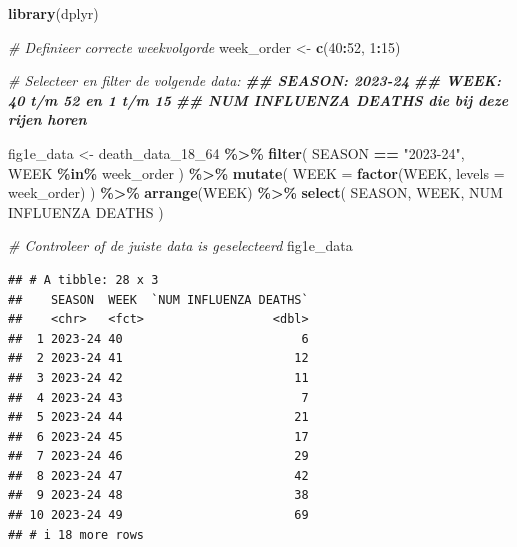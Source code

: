 \documentclass[
]{book}
\newenvironment{Shaded}{\begin{snugshade}}{\end{snugshade}}
\newcommand{\AttributeTok}[1]{\textcolor[rgb]{0.13,0.29,0.53}{#1}}
\newcommand{\CommentTok}[1]{\textcolor[rgb]{0.56,0.35,0.01}{\textit{#1}}}
\newcommand{\DecValTok}[1]{\textcolor[rgb]{0.00,0.00,0.81}{#1}}
\newcommand{\DocumentationTok}[1]{\textcolor[rgb]{0.56,0.35,0.01}{\textbf{\textit{#1}}}}
\newcommand{\FunctionTok}[1]{\textcolor[rgb]{0.13,0.29,0.53}{\textbf{#1}}}
\newcommand{\NormalTok}[1]{#1}
\newcommand{\OtherTok}[1]{\textcolor[rgb]{0.56,0.35,0.01}{#1}}
\newcommand{\SpecialCharTok}[1]{\textcolor[rgb]{0.81,0.36,0.00}{\textbf{#1}}}
\newcommand{\StringTok}[1]{\textcolor[rgb]{0.31,0.60,0.02}{#1}}
\begin{document}
\begin{Shaded}
\begin{Highlighting}[]
\FunctionTok{library}\NormalTok{(dplyr)}

\CommentTok{\# Definieer correcte weekvolgorde}
\NormalTok{week\_order }\OtherTok{\textless{}{-}} \FunctionTok{c}\NormalTok{(}\DecValTok{40}\SpecialCharTok{:}\DecValTok{52}\NormalTok{, }\DecValTok{1}\SpecialCharTok{:}\DecValTok{15}\NormalTok{)}

\CommentTok{\# Selecteer en filter de volgende data:}
\DocumentationTok{\#\# SEASON: 2023{-}24}
\DocumentationTok{\#\# WEEK: 40 t/m 52 en 1 t/m 15}
\DocumentationTok{\#\# NUM INFLUENZA DEATHS die bij deze rijen horen}

\NormalTok{fig1e\_data }\OtherTok{\textless{}{-}}\NormalTok{ death\_data\_18\_64 }\SpecialCharTok{\%\textgreater{}\%}
  \FunctionTok{filter}\NormalTok{(}
\NormalTok{    SEASON }\SpecialCharTok{==} \StringTok{"2023{-}24"}\NormalTok{,}
\NormalTok{    WEEK }\SpecialCharTok{\%in\%}\NormalTok{ week\_order}
\NormalTok{  ) }\SpecialCharTok{\%\textgreater{}\%}
  \FunctionTok{mutate}\NormalTok{(}
    \AttributeTok{WEEK =} \FunctionTok{factor}\NormalTok{(WEEK, }\AttributeTok{levels =}\NormalTok{ week\_order)}
\NormalTok{  ) }\SpecialCharTok{\%\textgreater{}\%}
  \FunctionTok{arrange}\NormalTok{(WEEK) }\SpecialCharTok{\%\textgreater{}\%}
  \FunctionTok{select}\NormalTok{(}
\NormalTok{    SEASON,}
\NormalTok{    WEEK,}
    \StringTok{\textasciigrave{}}\AttributeTok{NUM INFLUENZA DEATHS}\StringTok{\textasciigrave{}}
\NormalTok{  )}

\CommentTok{\# Controleer of de juiste data is geselecteerd}
\NormalTok{fig1e\_data}
\end{Highlighting}
\end{Shaded}

\begin{verbatim}
## # A tibble: 28 x 3
##    SEASON  WEEK  `NUM INFLUENZA DEATHS`
##    <chr>   <fct>                  <dbl>
##  1 2023-24 40                         6
##  2 2023-24 41                        12
##  3 2023-24 42                        11
##  4 2023-24 43                         7
##  5 2023-24 44                        21
##  6 2023-24 45                        17
##  7 2023-24 46                        29
##  8 2023-24 47                        42
##  9 2023-24 48                        38
## 10 2023-24 49                        69
## # i 18 more rows
\end{verbatim}
\end{document}
